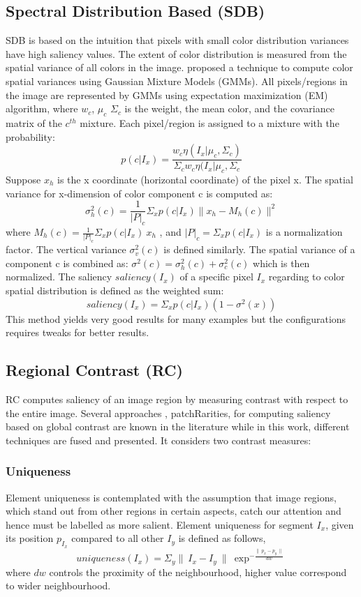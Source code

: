 \subsection{Spectral Distribution Based (SDB)} 
SDB is based on the intuition that pixels with small color distribution variances have high saliency values.  The extent of color distribution is measured from the spatial variance of all colors in the image.  \cite{spectralSal} proposed a technique to compute color spatial variances using Gaussian Mixture Models (GMMs).  All pixels/regions in the image are represented by GMMs using expectation maximization (EM) algorithm, where $w_{c}$, $\mu_{c}$ $\Sigma_{c}$ is the weight, the mean color, and the covariance matrix of the $c^{th}$ mixture. Each pixel/region is assigned to a mixture with the probability:
$$p(c | I_{x}) = \frac{w_{c}\eta(I_{x}| \mu_{c},\Sigma_{c})}{\Sigma_{c}w_{c}\eta(I_{x}| \mu_{c},\Sigma_{c}} $$
Suppose $x_{h}$ is the x coordinate (horizontal coordinate) of the pixel x. The spatial variance for x-dimension of color component c is computed as:
$$\sigma_{h}^{2}(c) = \frac{1}{|P|_{c}}\Sigma_{x}	p(c | I_{x}) \parallel x_{h} -M_{h}(c) \parallel^{2}$$
where $M_{h}(c) = \frac{1}{|P|_{c}}\Sigma_{x}p(c|I_{x})~x_h$ , and $|P|_{c} = \Sigma_{x}p(c | I_{x})$ is a normalization factor.  The vertical variance $\sigma_{v}^{2}(c)$ is defined similarly.  The spatial variance of a component c is combined as: $\sigma^{2}(c) = \sigma_{h}^{2}(c) + \sigma_{c}^{2}(c)$ which is then normalized.
The saliency $saliency(I_{x})$ of a specific pixel $I_{x}$ regarding to color spatial distribution is defined as the weighted sum:
$$saliency(I_{x}) = \Sigma_{x}p(c | I_{x})(1-\sigma^{2}(x))$$
This method yields very good results for many examples but the configurations requires tweaks for better results.

\subsection{Regional Contrast (RC)}
RC computes saliency of an image region by measuring contrast with respect to the entire image. Several approaches  \citep{globContrast}, {patchRarities}, \citep{salFilters} for computing saliency based on global contrast are known in the literature while in this work, different techniques are fused and presented.  It considers two contrast measures:
\subsubsection{Uniqueness}
Element uniqueness is contemplated with the assumption that image regions, which stand out from other regions in certain aspects, catch our attention and hence must be labelled as more salient.  Element uniqueness for segment $I_{x}$, given its position $p_{I_{x}}$ compared to all other $I_{y}$ is defined as follows,
$$uniqueness(I_{x}) = \Sigma_{y} \parallel~I_{x} -I_{y}~\parallel~\exp^{-\frac{\parallel~p_{x} - p_{y}~\parallel}{dw}}$$
where $dw$ controls the proximity of the neighbourhood, higher value correspond to wider neighbourhood.
